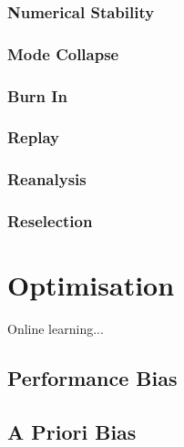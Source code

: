 \subsubsection{Numerical Stability}
\label{sec:bhh:selection_mechanism:numerical_stability}

\subsubsection{Mode Collapse}
\label{sec:bhh:selection_mechanism:mode_collapse}

\subsubsection{Burn In}
\label{sec:bhh:selection_mechanism:burn_in}

\subsubsection{Replay}
\label{sec:bhh:selection_mechanism:replay}

\subsubsection{Reanalysis}
\label{sec:bhh:selection_mechanism:reanalysis}

\subsubsection{Reselection}
\label{sec:bhh:selection_mechanism:reselection}



\section{Optimisation}
\label{sec:bhh:optimisation}

Online learning...

\subsection{Performance Bias}
\label{sec:bhh:optimisation:performance_bias}


\subsection{A Priori Bias}
\label{sec:bhh:optimisation:a_priori_bias}



